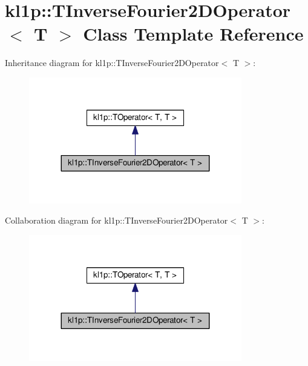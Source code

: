 \hypertarget{classkl1p_1_1TInverseFourier2DOperator}{}\section{kl1p\+:\+:T\+Inverse\+Fourier2\+D\+Operator$<$ T $>$ Class Template Reference}
\label{classkl1p_1_1TInverseFourier2DOperator}


Inheritance diagram for kl1p\+:\+:T\+Inverse\+Fourier2\+D\+Operator$<$ T $>$\+:
\nopagebreak
\begin{figure}[H]
\begin{center}
\leavevmode
\includegraphics[width=263pt]{classkl1p_1_1TInverseFourier2DOperator__inherit__graph}
\end{center}
\end{figure}


Collaboration diagram for kl1p\+:\+:T\+Inverse\+Fourier2\+D\+Operator$<$ T $>$\+:
\nopagebreak
\begin{figure}[H]
\begin{center}
\leavevmode
\includegraphics[width=263pt]{classkl1p_1_1TInverseFourier2DOperator__coll__graph}
\end{center}
\end{figure}
